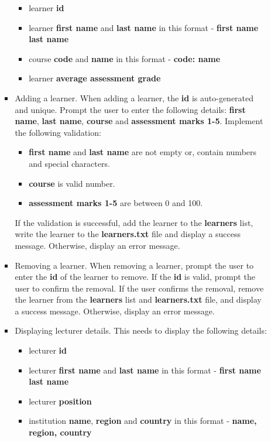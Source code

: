 \documentclass{article}
\begin{document}
\begin{itemize}
\begin{itemize}
\begin{itemize}
\begin{itemize}
                \item learner \textbf{id}
                \item learner \textbf{first name} and \textbf{last name} in this format - \textbf{first name last name}
                \item course \textbf{code} and \textbf{name} in this format - \textbf{code: name}
                \item learner \textbf{average assessment grade}
            \end{itemize}
            \item Adding a learner. When adding a learner, the \textbf{id} is auto-generated and unique. Prompt the user to enter the following details: \textbf{first name}, \textbf{last name}, \textbf{course} and \textbf{assessment marks 1-5}. Implement the following validation:
            \begin{itemize}
                \item \textbf{first name} and \textbf{last name} are not empty or, contain numbers and special characters.
                \item \textbf{course} is valid number.
                \item \textbf{assessment marks 1-5} are between 0 and 100.
            \end{itemize} 
            If the validation is successful, add the learner to the \textbf{learners} list, write the learner to the \textbf{learners.txt} file and display a success message. Otherwise, display an error message.             
            \item Removing a learner. When removing a learner, prompt the user to enter the \textbf{id} of the learner to remove. If the \textbf{id} is valid, prompt the user to confirm the removal. If the user confirms the removal, remove the learner from the \textbf{learners} list and \textbf{learners.txt} file, and display a success message. Otherwise, display an error message.             
            \item Displaying lecturer details. This needs to display the following details:
            \begin{itemize}
                \item lecturer \textbf{id}
                \item lecturer \textbf{first name} and \textbf{last name} in this format - \textbf{first name last name}
                \item lecturer \textbf{position}
                \item institution \textbf{name}, \textbf{region} and \textbf{country} in this format - \textbf{name, region, country}

\end{itemize}
\end{itemize}
\end{itemize}
\end{itemize}
\end{document}
